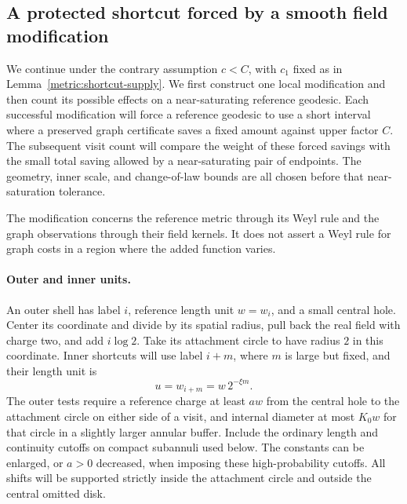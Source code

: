 \subsection{A protected shortcut forced by a smooth field modification}

We continue under the contrary assumption $c<C$, with $c_1$ fixed as in
Lemma~\ref{metric:shortcut-supply}. We first construct one local modification
and then count its possible effects on a near-saturating reference geodesic.
Each successful modification will force a reference geodesic to use a
short interval where a preserved graph certificate saves a fixed amount
against upper factor \(C\). The subsequent visit count will compare the
weight of these forced savings with the small total saving allowed by a
near-saturating pair of endpoints. The geometry, inner scale, and
change-of-law bounds are all chosen before that near-saturation tolerance.

The modification concerns the reference metric through its Weyl rule and
the graph observations through their field kernels. It does not assert a
Weyl rule for graph costs in a region where the added function varies.

\paragraph{Outer and inner units.}
An outer shell has label $i$, reference length unit $w=w_i$, and a small
central hole. Center its coordinate and divide by its spatial radius, pull
back the real field with charge two, and add $i\log2$. Take its attachment
circle to have radius $2$ in this coordinate. Inner shortcuts will use label
$i+m$, where $m$ is large but fixed, and their length unit is
\begin{equation}\label{metric:inner-unit}
 u=w_{i+m}=w\,2^{-\xi m}.
\end{equation}
The outer tests require a reference charge at least $aw$ from the central
hole to the attachment circle on either side of a visit, and internal
diameter at most $K_0w$ for that circle in a slightly larger annular buffer.
Include the ordinary length and continuity cutoffs on compact subannuli
used below. The constants can be enlarged, or $a>0$ decreased, when imposing
these high-probability cutoffs. All shifts will be supported strictly inside
the attachment circle and outside the central omitted disk.

